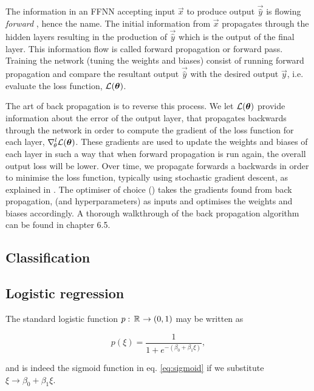     The information in an FFNN accepting input $\vec{x}$ to produce output $\vec{\hat{y}}$ is flowing \textit{forward} \citep{Goodfellow2016}, hence the name. The initial information from $\vec{x}$ propagates through the hidden layers resulting in the production of $\vec{\hat{y}}$ which is the output of the final layer. This information flow is called forward propagation or forward pass. Training the network (tuning the weights and biases) consist of running forward propagation and compare the resultant output $\vec{\hat{y}}$ with the desired output $\vec{y}$, i.e. evaluate the loss function, $\mathcal{L}(\boldsymbol{\theta})$. 
    

    The art of back propagation is to reverse this process. We let $\mathcal{L}(\boldsymbol{\theta})$ provide information about the error of the output layer, that propagates backwards through the network in order to compute the gradient of the loss function for each layer, $\nabla^l_{\!\theta}\mathcal{L}(\boldsymbol{\theta})$. These gradients are used to update the weights and biases of each layer in such a way that when forward propagation is run again, the overall output loss will be lower. Over time, we propagate forwards a backwards in order to minimise the loss function, typically using stochastic gradient descent, as explained in . The optimiser of choice () takes the gradients found from back propagation, (and hyperparameters) as inputs and optimises the weights and biases accordingly. A thorough walkthrough of the back propagation algorithm can be found in \citep{Goodfellow2016} chapter 6.5.


\subsection{Classification}\label{sec:classification}

\subsection{Logistic regression}\label{sec:logistic_regression}

The standard logistic function $p:\, \mathbb{R}^{} \to (0,1)$ may be written as 

\begin{equation}\label{eq:logistic_function}
    p(\xi) = \frac{1}{1+e^{-(\beta_0 + \beta_1\xi)}},
\end{equation}

and is indeed the sigmoid function in eq. \eqref{eq:sigmoid} if we substitute $\xi \to \beta_0 + \beta_1 \xi$. 
\fillertext

